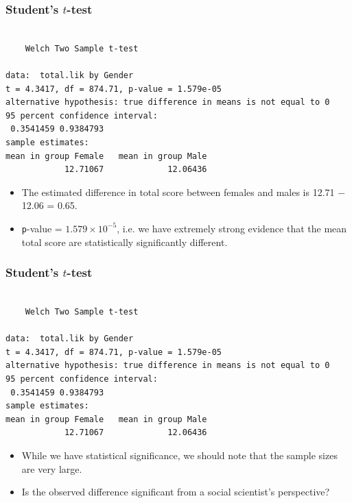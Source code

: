 \documentclass{beamer}\usepackage[]{graphicx}\usepackage[]{color}
\makeatletter
\newenvironment{kframe}{%
 \def\at@end@of@kframe{}%
 \ifinner\ifhmode%
  \def\at@end@of@kframe{\end{minipage}}%
  \begin{minipage}{\columnwidth}%
 \fi\fi%
 \def\FrameCommand##1{\hskip\@totalleftmargin \hskip-\fboxsep
 \colorbox{shadecolor}{##1}\hskip-\fboxsep
     \hskip-\linewidth \hskip-\@totalleftmargin \hskip\columnwidth}%
 \MakeFramed {\advance\hsize-\width
   \@totalleftmargin\z@ \linewidth\hsize
   \@setminipage}}%
 {\par\unskip\endMakeFramed%
 \at@end@of@kframe}
\newenvironment{knitrout}{}{} %
\makeatother
\begin{document}
\begin{frame}[fragile]
  \frametitle{Student's $t$-test}
\begin{knitrout}
\color{fgcolor}\begin{kframe}
\begin{verbatim}

	Welch Two Sample t-test

data:  total.lik by Gender
t = 4.3417, df = 874.71, p-value = 1.579e-05
alternative hypothesis: true difference in means is not equal to 0
95 percent confidence interval:
 0.3541459 0.9384793
sample estimates:
mean in group Female   mean in group Male 
            12.71067             12.06436 
\end{verbatim}
\end{kframe}
\end{knitrout}

\begin{itemize}
\item The estimated difference in total score between females and males is 12.71 $-$ 12.06 = 0.65.
\item \texttt{p}-value = \ensuremath{1.579\times 10^{-5}}, i.e. we have extremely strong evidence that the mean total score are statistically significantly different.
\end{itemize}
\end{frame}

\begin{frame}[fragile]
  \frametitle{Student's $t$-test}
\begin{knitrout}
\color{fgcolor}\begin{kframe}
\begin{verbatim}

	Welch Two Sample t-test

data:  total.lik by Gender
t = 4.3417, df = 874.71, p-value = 1.579e-05
alternative hypothesis: true difference in means is not equal to 0
95 percent confidence interval:
 0.3541459 0.9384793
sample estimates:
mean in group Female   mean in group Male 
            12.71067             12.06436 
\end{verbatim}
\end{kframe}
\end{knitrout}
\begin{itemize}
\item While we have statistical significance, we should note that the sample sizes are very large.
\item Is the observed difference significant from a social scientist's perspective?
\end{itemize}
\end{frame}
\end{document}
